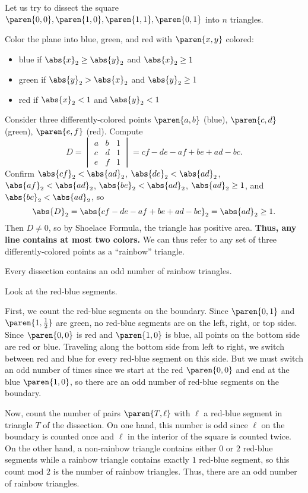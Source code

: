 Let us try to dissect the square $\paren{0,0},\paren{1,0},\paren{1,1},\paren{0,1}$ into $n$ triangles.

Color the plane into blue, green, and red with $\paren{x,y}$ colored:
\begin{itemize}

    \color{blue}
    \item blue if $\abs{x}_2\geq\abs{y}_2$ and $\abs{x}_2\geq1$
    
    \color{green}
    \item green if $\abs{y}_2>\abs{x}_2$ and $\abs{y}_2\geq1$
    
    \color{red}
    \item red if $\abs{x}_2<1$ and $\abs{y}_2<1$
    
\end{itemize}

Consider three differently-colored points $\paren{a,b}$ (blue), $\paren{c,d}$ (green), $\paren{e,f}$ (red). Compute \[D=\begin{vmatrix}
a & b & 1 \\
c & d & 1 \\
e & f & 1
\end{vmatrix}=cf-de-af+be+ad-bc.\] Confirm $\abs{cf}_2<\abs{ad}_2$, $\abs{de}_2<\abs{ad}_2$, $\abs{af}_2<\abs{ad}_2$, $\abs{be}_2<\abs{ad}_2$, $\abs{ad}_2\geq1$, and $\abs{bc}_2<\abs{ad}_2$, so \[\abs{D}_2=\abs{cf-de-af+be+ad-bc}_2=\abs{ad}_2\geq1.\] Then $D\neq0$, so by Shoelace Formula, the triangle has positive area. \textbf{Thus, any line contains at most two colors.} We can thus refer to any set of three differently-colored points as a ``rainbow'' triangle.

\begin{solutionlemma}
Every dissection contains an odd number of rainbow triangles.
\end{solutionlemma}

\begin{lemmaproof}
Look at the red-blue segments.

First, we count the red-blue segments on the boundary. Since $\paren{0,1}$ and $\paren{1,\frac{1}{2}}$ are green, no red-blue segments are on the left, right, or top sides. Since $\paren{0,0}$ is red and $\paren{1,0}$ is blue, all points on the bottom side are red or blue. Traveling along the bottom side from left to right, we switch between red and blue for every red-blue segment on this side. But we must switch an odd number of times since we start at the red $\paren{0,0}$ and end at the blue $\paren{1,0}$, so there are an odd number of red-blue segments on the boundary.

Now, count the number of pairs $\paren{T,\ell}$ with $\ell$ a red-blue segment in triangle $T$ of the dissection. On one hand, this number is odd since $\ell$ on the boundary is counted once and $\ell$ in the interior of the square is counted twice. On the other hand, a non-rainbow triangle contains either $0$ or $2$ red-blue segments while a rainbow triangle contains exactly $1$ red-blue segment, so this count mod $2$ is the number of rainbow triangles. Thus, there are an odd number of rainbow triangles.
\end{lemmaproof}

